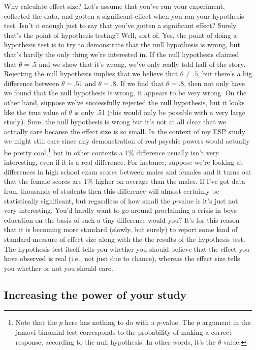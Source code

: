 \documentclass[
  a4paper,
]{book}
\begin{document}
Why calculate effect size? Let's assume that you've run your experiment,
collected the data, and gotten a significant effect when you ran your
hypothesis test. Isn't it enough just to say that you've gotten a
significant effect? Surely that's the point of hypothesis testing? Well,
sort of. Yes, the point of doing a hypothesis test is to try to
demonstrate that the null hypothesis is wrong, but that's hardly the
only thing we're interested in. If the null hypothesis claimed that
\(\theta = .5\) and we show that it's wrong, we've only really told half
of the story. Rejecting the null hypothesis implies that we believe that
\(\theta \neq .5\), but there's a big difference between
\(\theta = .51\) and \(\theta = .8\). If we find that \(\theta = .8\),
then not only have we found that the null hypothesis is wrong, it
appears to be very wrong. On the other hand, suppose we've successfully
rejected the null hypothesis, but it looks like the true value of
\(\theta\) is only .51 (this would only be possible with a very large
study). Sure, the null hypothesis is wrong but it's not at all clear
that we actually care because the effect size is so small. In the
context of my ESP study we might still care since any demonstration of
real psychic powers would actually be pretty cool,\footnote{Note that
  the \(p\) here has nothing to do with a \(p\)-value. The \(p\)
  argument in the jamovi binomial test corresponds to the probability of
  making a correct response, according to the null hypothesis. In other
  words, it's the \(\theta\) value.} but in other contexts a \(1\%\)
difference usually isn't very interesting, even if it is a real
difference. For instance, suppose we're looking at differences in high
school exam scores between males and females and it turns out that the
female scores are \(1\%\) higher on average than the males. If I've got
data from thousands of students then this difference will almost
certainly be statistically significant, but regardless of how small the
\emph{p}-value is it's just not very interesting. You'd hardly want to
go around proclaiming a crisis in boys education on the basis of such a
tiny difference would you? It's for this reason that it is becoming more
standard (slowly, but surely) to report some kind of standard measure of
effect size along with the the results of the hypothesis test. The
hypothesis test itself tells you whether you should believe that the
effect you have observed is real (i.e., not just due to chance), whereas
the effect size tells you whether or not you should care.

\hypertarget{increasing-the-power-of-your-study}{%
\subsection{Increasing the power of your
study}\label{increasing-the-power-of-your-study}}
\end{document}
